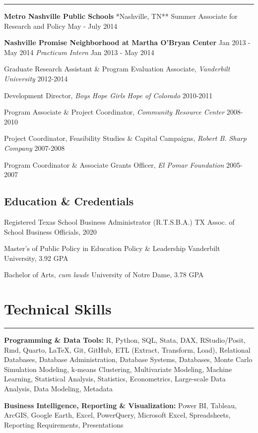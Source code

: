 \documentclass[
  11pt,
]
{article}
\begin{document}
\hrule

\textbf{Metro Nashville Public Schools} \hfill **Nashville, TN** Summer
Associate for Research and Policy \hfill May - July 2014

\textbf{Nashville Promise Neighborhood at Martha O'Bryan Center}
\hfill Jan 2013 - May 2014 \emph{Practicum Intern} \hfill Jan 2013 - May
2014

Graduate Research Assistant \& Program Evaluation Associate,
\emph{Vanderbilt University} \hfill 2012-2014

Development Director, \emph{Boys Hope Girls Hope of Colorado}
\hfill 2010-2011

Program Associate \& Project Coordinator, \emph{Community Resource
Center} \hfill 2008-2010

Project Coordinator, Feasibility Studies \& Capital Campaigns,
\emph{Robert B. Sharp Company} \hfill 2007-2008

Program Coordinator \& Associate Grants Officer, \emph{El Pomar
Foundation} \hfill 2005-2007

\subsection{\texorpdfstring{\textbf{Education \&
Credentials}}{Education \& Credentials}}\label{education-credentials}

Registered Texas School Business Administrator (R.T.S.B.A.) \hfill TX
Assoc. of School Business Officials, 2020

Master's of Public Policy in Education Policy \& Leadership
\hfill Vanderbilt University, 3.92 GPA

Bachelor of Arts, \emph{cum laude} \hfill University of Notre Dame, 3.78
GPA

\section{Technical Skills}\label{technical-skills}

\hrule

\textbf{Programming \& Data Tools:} R, Python, SQL, Stata, DAX,
RStudio/Posit, Rmd, Quarto, LaTeX, Git, GitHub, ETL (Extract, Transform,
Load), Relational Databases, Database Administration, Database Systems,
Databases, Monte Carlo Simulation Modeling, k-means Clustering,
Multivariate Modeling, Machine Learning, Statistical Analysis,
Statistics, Econometrics, Large-scale Data Analysis, Data Modeling,
Metadata

\textbf{Business Intelligence, Reporting \& Visualization:} Power BI,
Tableau, ArcGIS, Google Earth, Excel, PowerQuery, Microsoft Excel,
Spreadsheets, Reporting Requirements, Presentations
\end{document}
